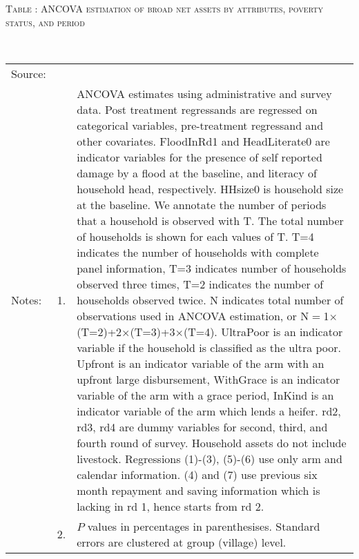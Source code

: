 \hspace{-1cm}\begin{minipage}[t]{14cm}
\hfil\textsc{\normalsize Table \thetable: ANCOVA estimation of broad net assets by attributes, poverty status, and period\label{tab ANCOVA net assets timevarying poverty status attributes}}\\
\setlength{\tabcolsep}{1pt}
\setlength{\baselineskip}{8pt}
\renewcommand{\arraystretch}{.55}
\hfil{}\\
\renewcommand{\arraystretch}{.8}
\setlength{\tabcolsep}{1pt}
\begin{tabular}{>{\hfill\scriptsize}p{1cm}<{}>{\hfill\scriptsize}p{.25cm}<{}>{\scriptsize}p{12cm}<{\hfill}}
Source:& \multicolumn{2}{l}{\scriptsize Estimated with GUK administrative and survey data.}\\
Notes: & 1. & ANCOVA estimates using administrative and survey data. Post treatment regressands are regressed on categorical variables, pre-treatment regressand and other covariates. \textsf{FloodInRd1} and \textsf{HeadLiterate0} are indicator variables for the presence of self reported damage by a flood at the baseline, and literacy of household head, respectively. \textsf{HHsize0} is household size at the baseline. We annotate the number of periods that a household is observed with \textsf{T}. The total number of households is shown for each values of \textsf{T}. \textsf{T=4} indicates the number of households with complete panel information, \textsf{T=3} indicates number of households observed three times, \textsf{T=2} indicates the number of households observed twice. \textsf{N} indicates total number of observations used in ANCOVA estimation, or \textsf{N$=$1$\times$(T=2)+2$\times$(T=3)+3$\times$(T=4)}.  \textsf{UltraPoor} is an indicator variable if the household is classified as the ultra poor. \textsf{Upfront} is an indicator variable of the arm with an upfront large disbursement, \textsf{WithGrace} is an indicator variable of the arm with a grace period, \textsf{InKind} is an indicator variable of the arm which lends a heifer. \textsf{rd2, rd3, rd4} are dummy variables for second, third, and fourth round of survey. Household assets do not include livestock. Regressions (1)-(3), (5)-(6) use only arm and calendar information. (4) and (7) use previous six month repayment and saving information which is lacking in rd 1, hence starts from rd 2.\\
& 2. & $P$ values in percentages in parenthesises. Standard errors are clustered at group (village) level.
\end{tabular}
\end{minipage}


